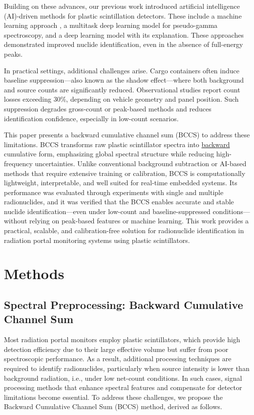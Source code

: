 \documentclass[10pt]{wlscirep}
\begin{document}
Building on these advances, our previous work introduced artificial intelligence (AI)-driven methods for plastic scintillation detectors. These include a machine learning approach \cite{Jeon2021CompML}, a multitask deep learning model for pseudo-gamma spectroscopy\cite{Jeon2021PseudoGamma}, and a deep learning model with its explanation\cite{Jeon2023Explanation}. These approaches demonstrated improved nuclide identification, even in the absence of full-energy peaks. 

In practical settings, additional challenges arise. Cargo containers often induce baseline suppression—also known as the shadow effect—where both background and source counts are significantly reduced. Observational studies report count losses exceeding 30\%, depending on vehicle geometry and panel position\cite{LoPresti2006BaselineSuppression}. Such suppression degrades gross-count or peak-based methods and reduces identification confidence, especially in low-count scenarios. 

This paper presents a backward cumulative channel sum (BCCS) to address these limitations. BCCS transforms raw plastic scintillator spectra into \ul{backward} cumulative form, emphasizing global spectral structure while reducing high-frequency uncertainties. Unlike conventional background subtraction or AI-based methods that require extensive training or calibration, BCCS is computationally lightweight, interpretable, and well suited for real-time embedded systems. Its performance was evaluated through experiments with single and multiple radionuclides, and it was verified that the BCCS enables accurate and stable nuclide identification—even under low-count and baseline-suppressed conditions—without relying on peak-based features or machine learning. This work provides a practical, scalable, and calibration-free solution for radionuclide identification in radiation portal monitoring systems using plastic scintillators.

\section*{Methods}

\subsection*{Spectral Preprocessing: Backward Cumulative Channel Sum}

Most radiation portal monitors employ plastic scintillators, which provide high detection efficiency due to their large effective volume but suffer from poor spectroscopic performance. As a result, additional processing techniques are required to identify radionuclides, particularly when source intensity is lower than background radiation, i.e., under low net-count conditions. In such cases, signal processing methods that enhance spectral features and compensate for detector limitations become essential. To address these challenges, we propose the Backward Cumulative Channel Sum (BCCS) method, derived as follows.
\end{document}
